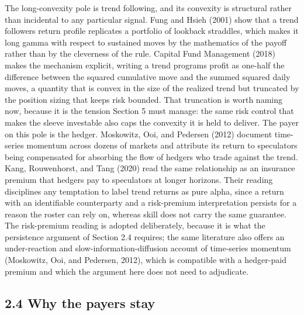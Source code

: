\documentclass[12pt, a4paper]{article}
\begin{document}
The long-convexity pole is trend following, and its convexity is
structural rather than incidental to any particular signal. Fung and
Hsieh (2001) show that a trend follower\textquotesingle s return profile
replicates a portfolio of lookback straddles, which makes it long gamma
with respect to sustained moves by the mathematics of the payoff rather
than by the cleverness of the rule. Capital Fund Management (2018) makes
the mechanism explicit, writing a trend program\textquotesingle s profit
as one-half the difference between the squared cumulative move and the
summed squared daily moves, a quantity that is convex in the size of the
realized trend but truncated by the position sizing that keeps risk
bounded. That truncation is worth naming now, because it is the tension
Section 5 must manage: the same risk control that makes the sleeve
investable also caps the convexity it is held to deliver. The payer on
this pole is the hedger. Moskowitz, Ooi, and Pedersen (2012) document
time-series momentum across dozens of markets and attribute its return
to speculators being compensated for absorbing the flow of hedgers who
trade against the trend. Kang, Rouwenhorst, and Tang (2020) read the
same relationship as an insurance premium that hedgers pay to
speculators at longer horizons. Their reading disciplines any temptation
to label trend returns as pure alpha, since a return with an
identifiable counterparty and a risk-premium interpretation persists for
a reason the roster can rely on, whereas skill does not carry the same
guarantee. The risk-premium reading is adopted deliberately, because it
is what the persistence argument of Section 2.4 requires; the same
literature also offers an under-reaction and slow-information-diffusion
account of time-series momentum (Moskowitz, Ooi, and Pedersen, 2012),
which is compatible with a hedger-paid premium and which the argument
here does not need to adjudicate.

\subsection*{2.4 Why the payers stay}\label{why-the-payers-stay}
\end{document}

